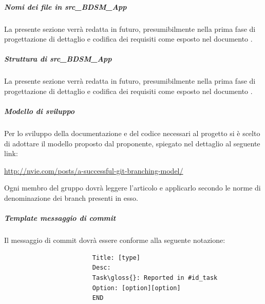 				\subparagraph{Nomi dei file in src\_BDSM\_App}
				La presente sezione verrà redatta in futuro, presumibilmente nella prima fase di progettazione di dettaglio e codifica dei requisiti come esposto nel documento \docNameVersionPdP.
				\subparagraph{Struttura di src\_BDSM\_App}
				La presente sezione verrà redatta in futuro, presumibilmente nella prima fase di progettazione di dettaglio e codifica dei requisiti come esposto nel documento \docNameVersionPdP.

				\subparagraph{Modello di sviluppo}
				Per lo sviluppo della documentazione e del codice necessari al progetto si è scelto di adottare il modello proposto dal proponente\gloss{}, spiegato nel dettaglio al seguente link:
					\begin{center}
						\url{http://nvie.com/posts/a-successful-git-branching-model/}
					\end{center}
					Ogni membro del gruppo dovrà leggere l'articolo e applicarlo secondo le norme di denominazione dei branch presenti in esso.

				\subparagraph{Template messaggio di commit}
				\label{sec:messaggio_di_commit}
				Il messaggio di commit\gloss{} dovrà essere conforme alla seguente notazione:
					\begin{verbatim}
						Title: [type]
						Desc:
						Task\gloss{}: Reported in #id_task
						Option: [option][option]
						END
					\end{verbatim}
				
				
